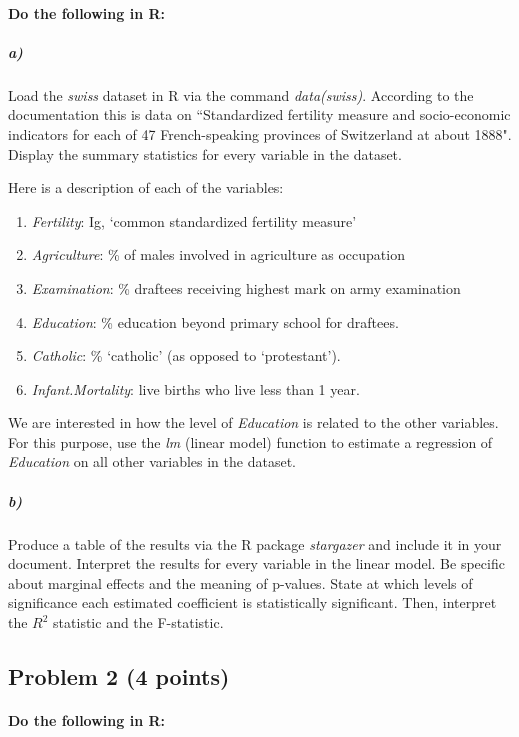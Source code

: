\documentclass[12pt]{article}
\begin{document}
\paragraph{Do the following in R:}

\subparagraph{a)} Load the \textit{swiss} dataset in R via the command \textit{data(swiss)}. According to the documentation this is data on ``Standardized fertility measure and socio-economic indicators for each of 47 French-speaking provinces of Switzerland at about 1888". Display the summary statistics for every variable in the dataset.

Here is a description of each of the variables:

\begin{enumerate}
	\item \textit{Fertility}: Ig, ‘common standardized fertility measure’
	\item \textit{Agriculture}: \% of males involved in agriculture as occupation
	\item \textit{Examination}: \% draftees receiving highest mark on army examination
	\item \textit{Education}: \% education beyond primary school for draftees.
	\item \textit{Catholic}: \% ‘catholic’ (as opposed to ‘protestant’).
	\item \textit{Infant.Mortality}: live births who live less than 1 year.
\end{enumerate}

We are interested in how the level of \textit{Education} is related to the other variables. For this purpose, use the \textit{lm} (linear model) function to estimate a regression of \textit{Education} on all other variables in the dataset.

\subparagraph{b)} Produce a table of the results via the R package \textit{stargazer} and include it in your document. Interpret the results for every variable in the linear model. Be specific about marginal effects and the meaning of p-values. State at which levels of significance each estimated coefficient is statistically significant. Then, interpret the $R^2$ statistic and the F-statistic.



\subsection*{Problem 2 (4 points)}

\paragraph{Do the following in R:}
\end{document}
